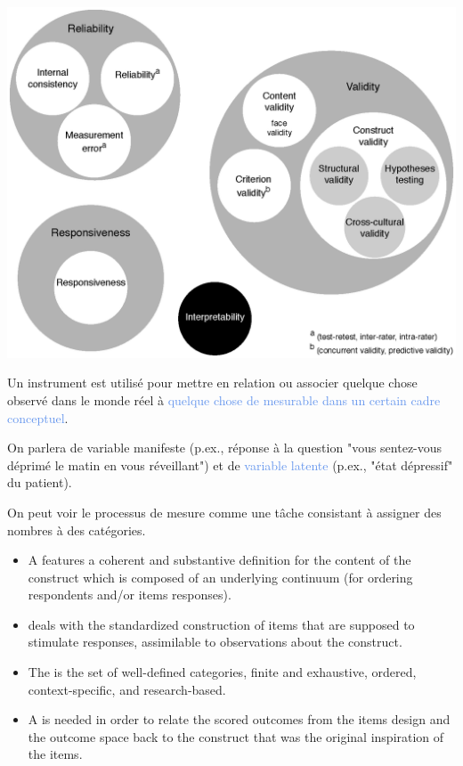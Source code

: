 
{\centering \includegraphics[width=.5\textwidth]{figs/cosmin_taxonomy.eps}\par}



Un instrument est utilisé pour mettre en relation ou associer
\textcolor{Apricot}{quelque chose observé dans le monde réel} à
\textcolor{CornflowerBlue}{quelque chose de mesurable dans un certain cadre
  conceptuel}.

On parlera de \textcolor{Apricot}{variable manifeste} (p.ex., réponse à la
question "vous sentez-vous déprimé le matin en vous réveillant") et de
\textcolor{CornflowerBlue}{variable latente} (p.ex., "état dépressif" du
patient). 

On peut voir le processus de mesure comme une tâche consistant à assigner des
nombres à des catégories\autocite{Stevens1946,DeBoeck2005}.


\begin{itemize}
\item A  features a coherent and substantive
  definition for the content of the construct which is composed of an
  underlying continuum (for ordering respondents and/or items
  responses).
\item {} deals with the standardized
  construction of items that are supposed to stimulate responses,
  assimilable to observations about the construct. 
\item The  is the set of well-defined
  categories, finite and exhaustive, ordered, context-specific, and
  research-based.
\item A  is needed in order to relate the
  scored outcomes from the items design and the outcome space back to
  the construct that was the original inspiration of the items.
\end{itemize}


